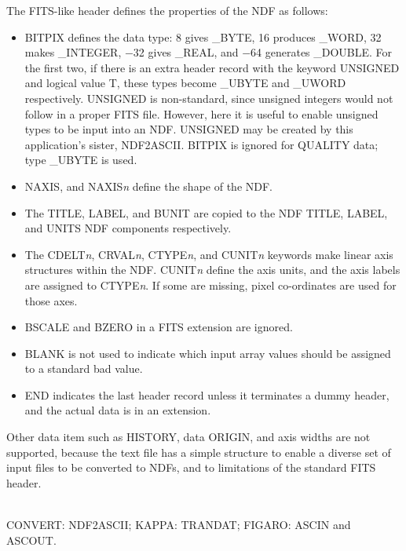 \documentclass[twoside,11pt]{article}
\newcommand{\htmlref}[2]{#1}
\newcommand{\xref}[3]{#1}
\newcommand{\CONVERT}{{\footnotesize CONVERT}}
\newcommand{\FIGARO}{{\footnotesize FIGARO}}
\newcommand{\KAPPA}{{\footnotesize KAPPA}}
\newcommand{\sstdiytopic}[2]{\goodbreak \item[{\hspace{-0.35em}#1\hspace{-0.35em}:}] \mbox{} \\[1.3ex] #2}
\newcommand{\sstitem}{\item}
\newcommand{\sstdiytopic}[2]{\\ \item[{#1}:]
      \begin{description}
         #2
      \end{description}
   }
\newcommand{\sstitem}{\item}
\begin{document}
{{{         \sstitem
            The FITS-like header defines the properties of the NDF as
            follows:
            \begin{itemize}
            \item BITPIX defines the data type: 8 gives \_BYTE, 16 produces
            \_WORD, 32 makes \_INTEGER, $-$32 gives \_REAL, and $-$64 generates
            \_DOUBLE.  For the first two, if there is an extra header
            record with the keyword UNSIGNED and logical value T, these
            types become \_UBYTE and \_UWORD respectively.  UNSIGNED is
            non-standard, since unsigned integers would not follow in a
            proper FITS file.  However, here it is useful to enable
            unsigned types to be input into an NDF.  UNSIGNED may be
            created by this application's sister, NDF2ASCII.  BITPIX is
            ignored for QUALITY data; type \_UBYTE is used.
            \item NAXIS, and NAXIS{\em{n}} define the shape of the NDF.
            \item The TITLE, LABEL, and BUNIT are copied to the NDF
            TITLE, LABEL, and UNITS NDF components respectively.
            \item The CDELT{\em{n}}, CRVAL{\em{n}}, CTYPE{\em{n}}, and 
            CUNIT{\em{n}} keywords make
            linear axis structures within the NDF.  CUNIT{\em{n}} define the
            axis units, and the axis labels are assigned to CTYPE{\em{n}}. 
            If some are missing, pixel co-ordinates are used for those
            axes.
            \item BSCALE and BZERO in a FITS extension are ignored.
            \item BLANK is not used to indicate which input array values
            should be assigned to a
            \xref{standard bad value}{sun95}{se_badmasking}.
            \item END indicates the last header record unless it
            terminates a dummy header, and the actual data is in an
            extension.
            \end{itemize}

         \sstitem
            Other data item such as HISTORY, data ORIGIN, and axis
            widths are not supported, because the text file has a simple
            structure to enable a diverse set of input files to be
            converted to NDFs, and to limitations of the standard FITS
            header.
      }
   }
   \sstdiytopic{
      Related Applications
   }{
      \CONVERT: \htmlref{NDF2ASCII}{NDF2ASCII};
      \KAPPA: \xref{TRANDAT}{sun95}{TRANDAT};
      \FIGARO: \xref{ASCIN}{sun86}{ASCIN} and
      \xref{ASCOUT}{sun86}{ASCOUT}.
   }
}
\end{document}
